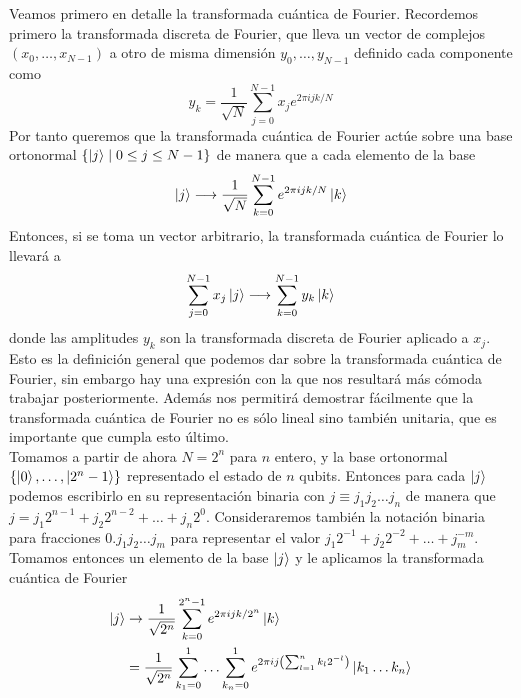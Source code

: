 \documentclass[a4paper]{article}
\numberwithin{equation}{section}
\begin{document}
Veamos primero en detalle la transformada cuántica de Fourier. Recordemos primero la transformada discreta de Fourier, que lleva un vector de complejos $(x_0, \ldots, x_{N-1})$ a otro de misma dimensión $y_0, \ldots, y_{N-1}$ definido cada componente como
\begin{equation}
y_k = \frac{1}{\sqrt{N}} \sum_{j=0}^{N-1} x_j e^{2\pi i j k /N}
\end{equation}
Por tanto queremos que la transformada cuántica de Fourier actúe sobre una base ortonormal $\{ \ket{j} \mid 0 \leq j \leq N-1 \}$ de manera que a cada elemento de la base
\begin{equation}
\ket{j} \longrightarrow \frac{1}{\sqrt{N}} \sum_{k=0}^{N-1} e^{2\pi i j k /N} \ket{k}
\end{equation}
Entonces, si se toma un vector arbitrario, la transformada cuántica de Fourier lo llevará a
\begin{equation}
\sum_{j=0}^{N-1} x_j \ket{j}
\longrightarrow
\sum_{k=0}^{N-1} y_k \ket{k}
\end{equation}
donde las amplitudes $y_k$ son la transformada discreta de Fourier aplicado a $x_j$. Esto es la definición general que podemos dar sobre la transformada cuántica de Fourier, sin embargo hay una expresión con la que nos resultará más cómoda trabajar posteriormente. Además nos permitirá demostrar fácilmente que la transformada cuántica de Fourier no es sólo lineal sino también unitaria, que es importante que cumpla esto último.\\
\linebreak
Tomamos a partir de ahora $N = 2^n$ para $n$ entero, y la base ortonormal $\{\ket{0}, \ldots, \ket{2^n-1}\}$ representado el estado de $n$ qubits. Entonces para cada $\ket{j}$ podemos escribirlo en su representación binaria con $j \equiv j_1 j_2 \ldots j_n$ de manera que $j = j_1 2^{n-1} + j_2 2^{n-2} + \ldots + j_n 2^0$. Consideraremos también la notación binaria para fracciones $0.j_1 j_2 \ldots j_m$ para representar el valor $j_1 2^{-1} + j_2 2^{-2} + \ldots + j_m ^{-m}$.
Tomamos entonces un elemento de la base $\ket{j}$ y le aplicamos la transformada cuántica de Fourier 
\begin{equation}
\begin{split}
\ket{j} &\rightarrow 
\frac{1}{\sqrt{2^n}}\sum_{k=0}^{2^n-1} e^{2\pi i j k /2^n} \ket{k}
\\ &=
\frac{1}{\sqrt{2^n}} \sum_{k_1=0}^{1} \ldots \sum_{k_n=0}^{1} e^{2\pi i j \left( \sum_{l=1}^{n} k_l 2^{-l} \right)} \ket{k_1\ldots k_n}
\end{split}
\end{equation}
\end{document}
